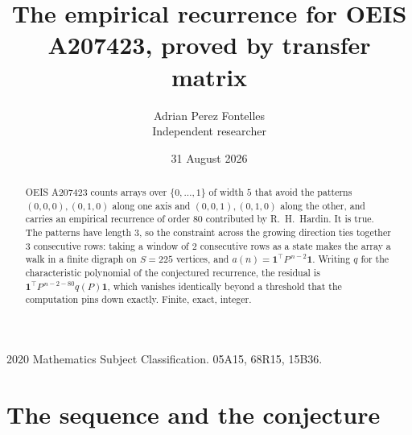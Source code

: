 \documentclass[11pt,a4paper]{article}
\title{The empirical recurrence for OEIS A207423, proved by transfer matrix}
\author{Adrian Perez Fontelles\\ \small Independent researcher}
\date{31 August 2026}
\theoremstyle{plain}
\theoremstyle{definition}
\begin{document}
\maketitle

\begin{abstract}
OEIS A207423 counts arrays over $\{0,\dots,1\}$ of width $5$ that avoid the patterns
$(0,0,0), (0,1,0)$ along one axis and $(0,0,1), (0,1,0)$ along the other, and carries an empirical recurrence of
order $80$ contributed by R.~H.~Hardin. It is true. The patterns have length $3$, so
the constraint across the growing direction ties together $3$ consecutive rows: taking a
window of $2$ consecutive rows as a state makes the array a walk in a finite digraph
on $S=225$ vertices, and $a(n)=\mathbf{1}^{\!\top}P^{\,n-2}\mathbf{1}$. Writing $q$
for the characteristic polynomial of the conjectured recurrence, the residual is
$\mathbf{1}^{\!\top}P^{\,n-2-80}q(P)\mathbf{1}$, which vanishes identically
beyond a threshold that the computation pins down exactly. Finite, exact, integer.
\end{abstract}

\noindent\small 2020 Mathematics Subject Classification. 05A15, 68R15, 15B36.\normalsize

\section{The sequence and the conjecture}
\end{document}
